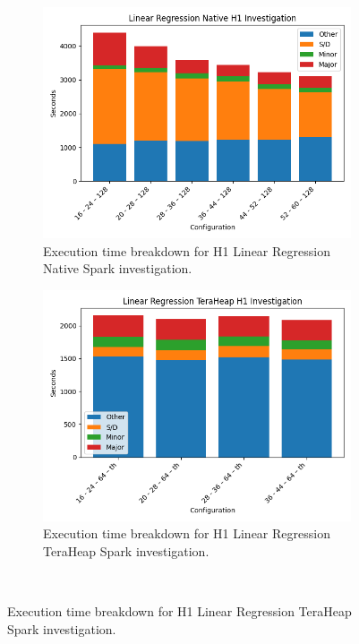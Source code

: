 \begin{figure}[htbp]
\begin{subfigure}[b]{0.48\textwidth}
    \includegraphics[width=\linewidth]{./fig/linr_h1_native.png}
    \caption{Execution time breakdown for H1 Linear Regression Native
    Spark investigation.}
    \label{fig:linr_h1_native}
\end{subfigure}

\begin{subfigure}[b]{0.48\textwidth}
    \includegraphics[width=\linewidth]{./fig/linr_h1_th.png}
    \caption{Execution time breakdown for H1 Linear Regression
    TeraHeap Spark investigation.}
    \label{fig:linr_h1_th}
\end{subfigure}\\[1em]
\end{figure}

